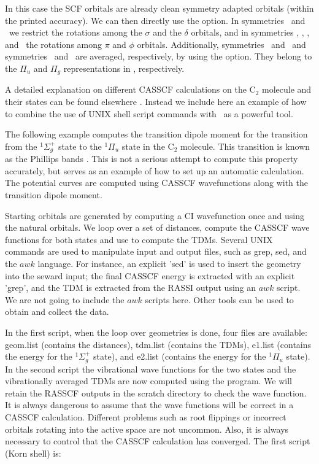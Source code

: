 In this case the SCF orbitals are already clean symmetry adapted orbitals
(within the printed accuracy).
We can then directly use the  option. In symmetries
\aog\ and \bou\ we restrict the rotations among the $\sigma$ and
the $\delta$ orbitals, and in symmetries \bttu, \btu, \btg, and
\bttg\ the rotations among $\pi$ and $\phi$ orbitals. Additionally,
symmetries \bttu\ and \btu\ and symmetries \btg\ and
\bttg\ are averaged, respectively, by using
the  option. They belong to the $\Pi_u$ and
$\Pi_g$ representations in \Dinfh, respectively.

A detailed explanation on different CASSCF calculations on the C$_2$
molecule and their states can be found elsewhere \cite{Roos:87}.
Instead we include here an example of how to combine the use of
UNIX shell script commands with \molcas\ as a powerful tool.

The following example computes the transition dipole moment for the transition
from the $^1\Sigma_g^+$ state to the $^1\Pi_u$ state in the C$_2$
molecule. This transition is known as the Phillips bands \cite{Herzberg:66}.
This is not a serious attempt to compute this property accurately, but serves
as an example of how to set up an automatic calculation. 
The potential curves are computed using CASSCF wavefunctions
along with the transition dipole moment. 


Starting orbitals are generated by computing a CI wavefunction once and
using the natural orbitals. We loop over a set of distances, compute the
CASSCF wave functions for both states and use  to compute the TDMs.
Several UNIX commands are used to manipulate input and output files,
such as grep, sed, and the $awk$ language. For instance, an explicit 'sed'
is used to insert the geometry into the seward input; the final CASSCF 
energy is extracted with an explicit 'grep', and the TDM is extracted from the
RASSI output using an $awk$ script. We are not going to include the $awk$ scripts
here. Other tools can be used to obtain and collect the data.

In the first script, when the loop over geometries is done, four files are available:
geom.list (contains the distances), tdm.list (contains the TDMs), 
e1.list (contains the energy for the $^1\Sigma_g^+$ state), and
e2.list (contains the energy for the $^1\Pi_u$ state). In the second script the vibrational
wave functions for the two states and the vibrationally averaged TDMs
are now computed using the  program. We will retain the RASSCF outputs
in the scratch directory to check the wave function. It is always dangerous
to assume that the wave functions will be correct in a CASSCF calculation.
Different problems such as root flippings or incorrect orbitals rotating into the
active space are not uncommon. Also, it is always necessary to control that the
CASSCF calculation has converged. The first script (Korn shell) is:

